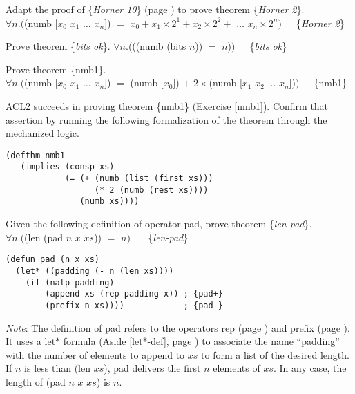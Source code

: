 \begin{ExerciseList}

\Exercise \label{horner2-thm}
Adapt the proof of \{\emph{Horner 10}\} (page \pageref{horner10-thm}) to prove theorem
\{\emph{Horner 2}\}.\\
\hspace*{16mm}$\forall n.($\textsf{(numb [$x_0$ $x_1$ $\dots$ $x_{n}$])}
$=$ $x_0 + x_1 \times 2^1 + x_2 \times 2^2 +$ $\dots$ $x_{n} \times 2^{n})$~~~\{\emph{Horner 2}\}

\Exercise \label{bits-ok}
Prove theorem
\{\emph{bits ok}\}.
$\forall n.$(\textsf{((numb (bits $n$)) $=$ $n$)}$)$~~~\{\emph{bits ok}\}

\Exercise \label{nmb1}
Prove theorem
\{nmb1\}.\\
\hspace*{16mm}$\forall n.($\textsf{(numb [$x_0$ $x_1$ $\dots$ $x_{n}$])}
$=$ \textsf{(numb [$x_0$]) $+$ $2\times$(numb [$x_1$ $x_2$ $\dots$ $x_{n}$])}$)$~~~\{nmb1\}

\Exercise \label{nmb1-acl2}
ACL2 succeeds in proving theorem \{nmb1\} (Exercise \ref{nmb1}).
Confirm that assertion by running the following
formalization of the theorem through the mechanized logic.
\begin{Verbatim}
(defthm nmb1
   (implies (consp xs)
            (= (+ (numb (list (first xs)))
                  (* 2 (numb (rest xs))))
               (numb xs))))
\end{Verbatim}

\Exercise Given the following definition of operator \textsf{pad}, prove theorem \{\emph{len-pad}\}.\\
\hspace*{16mm}$\forall n.($\textsf{(len (pad $n$ $x$ $xs$))} $=$ $n)$~~~ \{\emph{len-pad}\}
\begin{samepage}
\label{pad-defun}
\begin{Verbatim}
(defun pad (n x xs)
  (let* ((padding (- n (len xs))))
    (if (natp padding)
        (append xs (rep padding x)) ; {pad+}
        (prefix n xs))))            ; {pad-}
\end{Verbatim}
\end{samepage}
\emph{Note}: The definition of \textsf{pad} refers to the operators
\textsf{rep} (page \pageref{rep-equations}) and \textsf{prefix} (page \pageref{prefix-equations}).
It uses a \textsf{let$*$} formula (Aside \ref{let*-def}, page \pageref{let*-def})
to associate the name ``\textsf{padding}'' with the number of elements to append to $xs$
to form a list of the desired length. If $n$ is less than \textsf{(len $xs$)},
\textsf{pad} delivers the first $n$ elements of $xs$. In any case, the length of
\textsf{(pad $n$ $x$ $xs$)} is $n$.


\end{ExerciseList}

